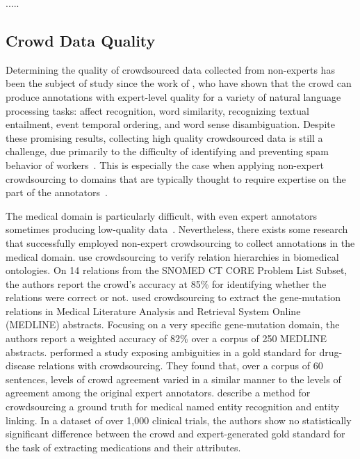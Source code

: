 .....

\subsection{Crowd Data Quality}

Determining the quality of crowdsourced data collected from non-experts has been the subject of study since the work of \citet{Snow:2008}, who have shown that the crowd can produce annotations with expert-level quality for a variety of natural language processing tasks: affect  recognition, word similarity, recognizing textual entailment, event temporal ordering, and word sense disambiguation. Despite these promising results, collecting high quality crowdsourced data is still a challenge, due primarily to the difficulty of identifying and preventing spam behavior of workers~\cite{difallah2012mechanical,demartini2012zencrowd}. This is especially the case when applying non-expert crowdsourcing to domains that are typically thought to require expertise on the part of the annotators~\cite{callison2010creating}.

The medical domain is particularly difficult, with even expert annotators sometimes producing low-quality data~\cite{Marcheggiani:2017:ELT:3139489.3106235}. Nevertheless, there exists some research that successfully employed non-expert crowdsourcing to collect annotations in the medical domain. \citet{mortensen2013crowdsourcing} use crowdsourcing to verify relation hierarchies in biomedical ontologies. On 14 relations from the SNOMED CT CORE Problem List Subset, the authors report the crowd's accuracy at 85\% for identifying whether the relations were correct or not. \citet{burger2012validating} used crowdsourcing to extract the gene-mutation relations in Medical Literature Analysis and Retrieval System Online (MEDLINE) abstracts. Focusing on a very specific gene-mutation domain, the authors report a weighted accuracy of 82\% over a corpus of 250 MEDLINE abstracts. \citet{li2015exposing} performed a study exposing ambiguities in a gold standard for drug-disease relations with crowdsourcing. They found that, over a corpus of 60 sentences, levels  of  crowd agreement varied in a similar manner to the levels of agreement  among  the  original  expert  annotators. \citet{zhai2013web} describe a method for crowdsourcing a ground truth for medical named entity recognition and entity linking. In a dataset of over 1,000 clinical trials, the authors show no statistically significant difference between the crowd and expert-generated gold standard for the task of extracting medications and their attributes.

